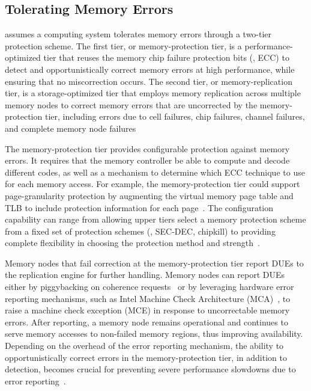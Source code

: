 
\subsection{Tolerating Memory Errors}
\ramp assumes a computing system tolerates memory errors through a two-tier protection scheme. 
The first tier, or memory-protection tier, is a performance-optimized tier that reuses the memory chip failure protection bits (\eg, ECC) to detect and opportunistically correct memory errors at high performance, while ensuring that no miscorrection occurs.
The second tier, or memory-replication tier, is a storage-optimized tier that employs memory replication across multiple memory nodes to correct memory errors that are uncorrected by the memory-protection tier, including errors due to cell failures, chip failures, channel failures, and complete memory node failures

The memory-protection tier provides configurable protection against memory errors.
It requires that the memory controller be able to compute and decode different codes, as well as a mechanism to determine which ECC technique to use for each memory access. 
For example, the memory-protection tier could support page-granularity protection by augmenting the virtual memory page table and TLB to include protection information for each page~\cite{yoon:virtualized-ecc:asplos:2010}. 
The configuration capability can range from allowing upper tiers select a memory protection scheme from a fixed set of protection schemes (\eg, SEC-DEC, chipkill) to providing complete flexibility in choosing the protection method and strength~\cite{yoon:virtualized-ecc:asplos:2010}.

Memory nodes that fail correction at the memory-protection tier report DUEs to the replication engine for further handling. 
Memory nodes can report DUEs either by piggybacking on coherence requests~\cite{patil:dve:isca:2021} or by leveraging hardware error reporting mechanisms, such as Intel Machine Check Architecture (MCA)~\cite{intel:mce:book:2024, xu:nova-fortis:sosp:2017}, to raise a machine check exception (MCE) in response to uncorrectable memory errors.
After reporting, a memory node remains operational and continues to serve memory accesses to non-failed
memory regions, thus improving availability. 
Depending on the overhead of the error reporting mechanism, the ability to opportunistically correct errors in the memory-protection tier, in addition to detection, becomes crucial for preventing severe performance slowdowns due to error reporting~\cite{meza:dramfailures:dsn:2015, barroso:wsc:book:2018}.

